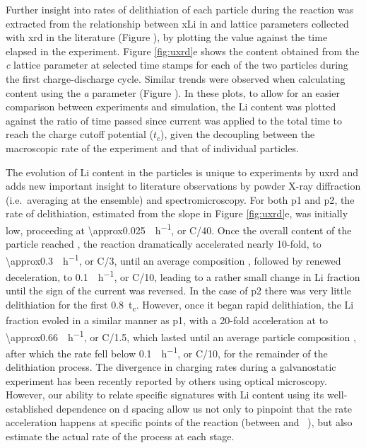 \documentclass{article}
\begin{document}
\newpage %
Further insight into rates of delithiation of each particle during the
reaction was extracted from the relationship between \gls{xLi} in
 and lattice parameters collected with \gls{xrd} in the
literature\cite{robert2015} (Figure ), by
plotting the value against the time elapsed in the experiment. Figure
\ref{fig:uxrd}e shows the  content obtained from the \emph{c}
lattice parameter at selected time stamps for each of the two 
particles during the first charge-discharge cycle. Similar trends were
observed when calculating  content using the \emph{a} parameter
(Figure ). In these plots, to allow for an easier
comparison between experiments and simulation, the Li content was
plotted against the ratio of time passed since current was applied to
the total time to reach the charge cutoff potential ($t_c$), given the
decoupling between the macroscopic rate of the experiment and that of
individual particles.

The evolution of Li content in the particles is unique to experiments
by \gls{uxrd} and adds new important insight to literature
observations by powder X-ray diffraction (i.e.\ averaging at the
ensemble) and
spectromicroscopy\cite{doeff2017,wolf2017,hulzen2018,ahn2017,zhou2016-2,robert2015,yoon2006,hua2018,grenier2017,chapman2020,chueh2021,
  zhao2022, rao2021, wang2020-6}. For both \gls{p1} and \gls{p2}, the
rate of delithiation, estimated from the slope in Figure
\ref{fig:uxrd}e, was initially low, proceeding at
\SI{\approx0.025}{\per\hour}, or C/40. Once the overall content
of the particle reached , the reaction dramatically
accelerated nearly 10-fold, to \SI{\approx0.3}{\per\hour}, or
C/3, until an average composition , followed by renewed
deceleration, to \SI{0.1}{\per\hour}, or C/10, leading to a
rather small change in Li fraction until the sign of the current was
reversed. In the case of \gls{p2} there was very little delithiation
for the first \SI{0.8}{t_c}. However, once it began rapid
delithiation, the Li fraction evoled in a similar manner as \gls{p1},
with a 20-fold acceleration at  to
\SI{\approx0.66}{\per\hour}, or C/1.5, which lasted until an
average particle composition , after which the rate fell below
\SI{0.1}{\per\hour}, or C/10, for the remainder of the
delithiation process. The divergence in charging rates during a
galvanostatic experiment has been recently reported by others using
optical microscopy\cite{zhao2022}. However, our ability to relate
specific signatures with Li content using its well-established
dependence on d spacing allow us not only to pinpoint that the rate
acceleration happens at specific points of the reaction (between
 and ~), but also estimate the actual rate of the
process at each stage.
\end{document}
